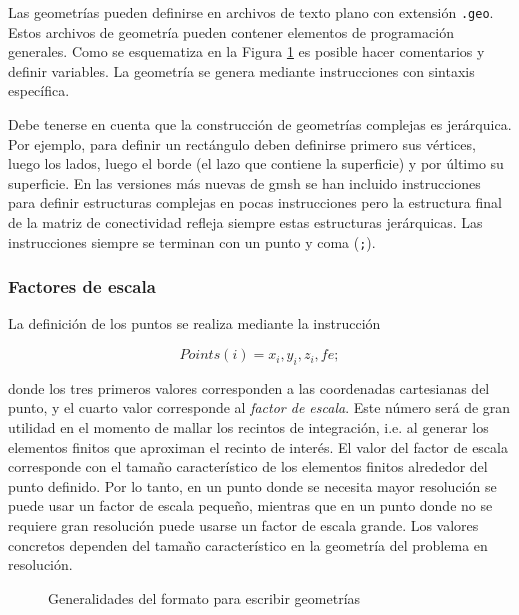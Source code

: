 
Las geometrías pueden definirse en archivos de texto plano con
extensión \texttt{.geo}. Estos archivos de geometría pueden
contener elementos de programación generales. Como se
esquematiza en la Figura \ref{FiguraEjemploGeometrias} 
es posible hacer comentarios y definir variables. La geometría
se genera mediante instrucciones con sintaxis específica. 

Debe tenerse en cuenta que la construcción de geometrías 
complejas es jerárquica. Por ejemplo, para definir un 
rectángulo deben definirse primero sus vértices, luego 
los lados, luego el borde (el lazo que contiene la superficie) y
por último su superficie. En las versiones más nuevas de gmsh
se han incluido instrucciones para definir estructuras complejas
en pocas instrucciones pero la estructura final de la 
matriz de conectividad refleja siempre estas estructuras jerárquicas. 
Las instrucciones siempre se terminan con un punto y coma (\texttt{;}).

\subsubsection{Factores de escala}
La definición de los puntos se realiza mediante la instrucción 

$$ Points( i ) = { x_i, y_i , z_i , fe } ; $$

donde los tres primeros valores corresponden a las coordenadas
cartesianas del punto, y el cuarto valor corresponde al 
\emph{factor de escala}. Este número será de gran utilidad
en el momento de mallar los recintos de integración, i.e. al 
generar los elementos finitos que aproximan el recinto de interés. 
El valor del factor de escala corresponde con el tamaño 
característico de los elementos finitos alrededor del punto
definido. Por lo tanto, en un punto donde se necesita 
mayor resolución se puede usar un factor de escala pequeño,
mientras que en un punto donde no se requiere gran resolución
puede usarse un factor de escala grande. Los valores 
concretos dependen del tamaño característico en la geometría 
del problema en resolución. 

\begin{figure}
  \caption{Generalidades del formato para escribir geometrías
  \label{FiguraEjemploGeometrias}
  }

\end{figure}

